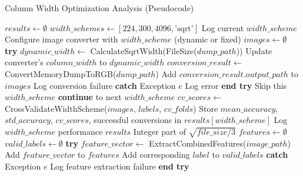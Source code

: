 \begin{algorithm}[!htbp]
\caption{Column Width Optimization Analysis (Pseudocode)}
\label{alg:column-width-optimization}
\begin{algorithmic}[1]
    \State $results \leftarrow \emptyset$
    \State $width\_schemes \leftarrow [224, 300, 4096, \text{'sqrt'}]$
        \State Log current $width\_scheme$
        \State Configure image converter with $width\_scheme$ (dynamic or fixed)
        \State $images \leftarrow \emptyset$
            \State \textbf{try}
                    \State $dynamic\_width \leftarrow$ CalculateSqrtWidth(FileSize($dump\_path$))
                    \State Update converter's $column\_width$ to $dynamic\_width$
                \EndIf
                \State $conversion\_result \leftarrow$ ConvertMemoryDumpToRGB($dump\_path$)
                    \State Add $conversion\_result.output\_path$ to $images$
                \Else
                    \State Log conversion failure
                \EndIf
            \State \textbf{catch} {Exception $e$}
                \State Log error
            \State \textbf{end try}
        \EndFor
            \State Skip this $width\_scheme$
            \State \textbf{continue} to next $width\_scheme$
        \EndIf
        \State $cv\_scores \leftarrow$ CrossValidateWidthScheme($images$, $labels$, $cv\_folds$)
        \State Store $mean\_accuracy$, $std\_accuracy$, $cv\_scores$, successful conversions in $results[width\_scheme]$
        \State Log $width\_scheme$ performance
    \EndFor
    \Return $results$
\EndProcedure
\Statex
{}
    \Return Integer part of $\sqrt{file\_size / 3}$
\EndProcedure
\Statex
{}
    \State $features \leftarrow \emptyset$
    \State $valid\_labels \leftarrow \emptyset$
        \State \textbf{try}
            \State $feature\_vector \leftarrow$ ExtractCombinedFeatures($image\_path$)
            \State Add $feature\_vector$ to $features$
            \State Add corresponding $label$ to $valid\_labels$
        \State \textbf{catch} {Exception $e$}
            \State Log feature extraction failure
        \State \textbf{end try}

\end{algorithmic}
\end{algorithm}
